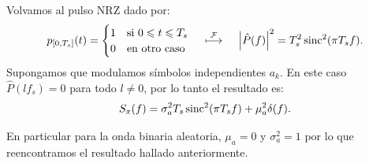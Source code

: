 \begin{ejemplo}
    Volvamos al pulso NRZ dado por:
    \begin{equation*}
    p_{[0,T_s]}(t)=\begin{cases}
            1 & \text{si } 0 \leqslant t \leqslant T_s\\
            0 & \text{en otro caso}
          \end{cases} \quad \;\displaystyle{\mathop{\longmapsto}^{\mathcal{F}}}\; \quad \left|\hat{P}(f)\right|^2=T_s^2\operatorname{sinc}^2(\pi T_s f).
    \end{equation*}
Supongamos que modulamos símbolos independientes $a_k$. En este caso $\hat{P}(lf_s)=0$ para todo $l\neq 0$, por lo tanto el resultado es:
\begin{equation*}
S_x(f) = \sigma_a^2 T_s \operatorname{sinc}^2 (\pi T_s f) + \mu_a^2\delta(f).    
\end{equation*}

    \begin{center}
    \end{center}
En particular para la onda binaria aleatoria, $\mu_a=0$ y $\sigma_a^2=1$ por lo que reencontramos el resultado hallado anteriormente.
\end{ejemplo}


